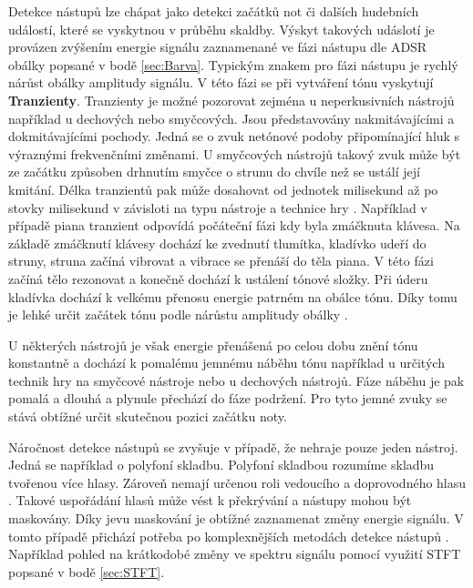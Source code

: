 Detekce nástupů lze chápat jako detekci začátků not či dalších hudebních událostí, které se vyskytnou v průběhu skaldby.
Výskyt takových udáslotí je provázen zvýšením energie signálu zaznamenané ve fázi nástupu dle ADSR obálky popsané v bodě \ref{sec:Barva}.
Typickým znakem pro fázi nástupu je rychlý nárůst obálky amplitudy signálu.
V této fázi se při vytváření tónu vyskytují \textbf{Tranzienty}. Tranzienty je možné pozorovat zejména u neperkusivních nástrojů například u dechových nebo smyčcových.
Jsou představovány nakmitávajícími a dokmitávajícími pochody. Jedná se o zvuk netónové podoby připomínající hluk s výraznými frekvenčními změnami.
U smyčcových nástrojů takový zvuk může být ze začátku způsoben drhnutím smyčce o strunu do chvíle než se ustálí její kmitání. Délka tranzientů pak může dosahovat od jednotek milisekund až po stovky milisekund v závisloti na typu nástroje a technice hry \cite{syrový2013hudební}.
Například v případě piana tranzient odpovídá počáteční fázi kdy byla zmáčknuta klávesa.
Na základě zmáčknutí klávesy dochází ke zvednutí tlumítka, kladívko udeří do struny, struna začíná vibrovat a vibrace se přenáší do těla piana.
V této fázi začíná tělo rezonovat a konečně dochází k ustálení tónové složky. Při úderu kladívka dochází k velkému přenosu energie patrném na obálce tónu. Díky tomu je lehké určit začátek tónu podle nárůstu amplitudy obálky \cite{fundamental_of_music_processing}.

U některých nástrojů je však energie přenášená po celou dobu znění tónu konstantně a dochází k pomalému jemnému náběhu tónu například u určitých technik hry na smyčcové nástroje nebo u dechových nástrojů. Fáze náběhu je pak pomalá a dlouhá a plynule přechází do fáze podržení. Pro tyto jemné zvuky se stává obtížné určit skutečnou pozici začátku noty.


Náročnost detekce nástupů se zvyšuje v případě, že nehraje pouze jeden nástroj. Jedná se například o polyfoní skladbu. Polyfoní skladbou rozumíme skladbu tvořenou více hlasy.
Zároveň nemají určenou roli vedoucího a doprovodného hlasu \cite{6155601}.
Takové uspořádání hlasů může vést k překrývání a nástupy mohou být maskovány. Díky jevu maskování je obtížné zaznamenat změny energie signálu. V tomto případě přichází potřeba po komplexnějších metodách detekce nástupů \cite{fundamental_of_music_processing}. Například pohled na krátkodobé změny ve spektru signálu pomocí využití \acs{STFT} popsané v bodě \ref{sec:STFT}.


